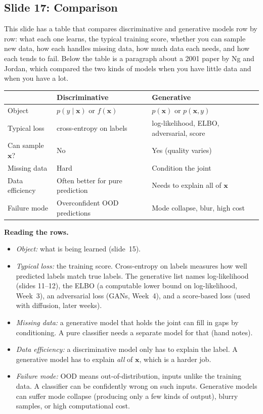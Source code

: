 \subsection*{Slide 17: Comparison}

This slide has a table that compares discriminative and generative models row by row: what each one learns, the typical training score, whether you can sample new data, how each handles missing data, how much data each needs, and how each tends to fail. Below the table is a paragraph about a 2001 paper by Ng and Jordan, which compared the two kinds of models when you have little data and when you have a lot.

\begin{center}
\begin{tabular}{p{}p{}p{}}
\toprule
 & Discriminative & Generative \\
\midrule
Object & $p(y\mid\mathbf{x})$ or $f(\mathbf{x})$ & $p(\mathbf{x})$ or $p(\mathbf{x},y)$ \\ \addlinespace
Typical loss & cross-entropy on labels & log-likelihood, ELBO, adversarial, score \\ \addlinespace
Can sample $\mathbf{x}$? & No & Yes (quality varies) \\ \addlinespace
Missing data & Hard & Condition the joint \\ \addlinespace
Data efficiency & Often better for pure prediction & Needs to explain all of $\mathbf{x}$ \\ \addlinespace
Failure mode & Overconfident OOD predictions & Mode collapse, blur, high cost \\
\bottomrule
\end{tabular}
\end{center}

\textbf{Reading the rows.}
\begin{itemize}
\item \textit{Object:} what is being learned (slide~15).
\item \textit{Typical loss:} the training score. Cross-entropy on labels measures how well predicted labels match true labels. The generative list names log-likelihood (slides 11--12), the ELBO (a computable lower bound on log-likelihood, Week~3), an adversarial loss (GANs, Week~4), and a score-based loss (used with diffusion, later weeks).
\item \textit{Missing data:} a generative model that holds the joint can fill in gaps by conditioning. A pure classifier needs a separate model for that (hand notes).
\item \textit{Data efficiency:} a discriminative model only has to explain the label. A generative model has to explain \textit{all} of $\mathbf{x}$, which is a harder job.
\item \textit{Failure mode:} OOD means out-of-distribution, inputs unlike the training data. A classifier can be confidently wrong on such inputs. Generative models can suffer mode collapse (producing only a few kinds of output), blurry samples, or high computational cost.
\end{itemize}

